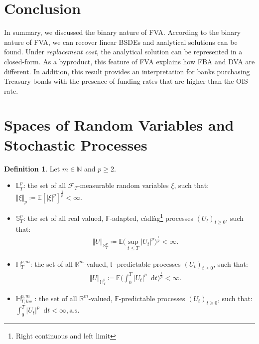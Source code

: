 \documentclass[a4paper, 11pt]{article}              %
\numberwithin{equation}{section}
\theoremstyle{plain}
\newcommand{\1}{\mathds{1}}
\newcommand{\calF}{\mathcal{F}}
\newcommand{\dsE}{\mathbb{E}}
\newcommand{\dsF}{\mathbb{F}}
\newcommand{\dsH}{\mathbb{H}}
\newcommand{\dsL}{\mathbb{L}}
\newcommand{\dsR}{\mathbb{R}}
\newcommand{\dsS}{\mathbb{S}}
\theoremstyle{plain}
\newtheorem{definition}[thm]{Definition}
\theoremstyle{definition}
\newtheorem{definition}{Definition}
\theoremstyle{plain}
\newcommand*\df{\mathop{}\!\mathrm{d}}
\begin{document}
\section{Conclusion}
In summary, we discussed the binary nature of FVA. According to the binary
nature of FVA, we can recover linear BSDEs and analytical solutions can be
found. Under \textit{replacement cost}, the analytical solution can be
represented in a closed-form. As a byproduct, this feature of FVA explains how
FBA and DVA are different.  In addition, this result provides an interpretation
for banks purchasing Treasury bonds with the presence of funding rates that are
higher than the OIS rate.


   
 
\appendix

\section{Spaces of Random Variables and Stochastic Processes}
\label{sec:spaces}       
\begin{definition} Let $m \in \mathbb{N}$ and $p \geq 2$.
\begin{itemize}
\item $\dsL^p_T$: the set of all $\calF_T$-measurable random variables $\xi$, such that:
 $ \Vert\xi \Vert_p\coloneqq \dsE[|\xi|^p]^{\frac{1}{p}}<\infty$. 
\item $\dsS^p_T$: the set of all real valued,
  $\dsF$-adapted, c\`adl\`ag\footnote{Right continuous
    and left limit} processes $(U_t)_{t\geq0}$, such that:
  \begin{align}
    \Vert U \Vert_{\dsS_T^p} \coloneqq \dsE\big(\sup\limits_{t \leq T}\vert
    U_t\vert^p\big)^{\frac{1}{p}}< \infty.  \nonumber
  \end{align}
\item $\dsH^{p, m}_T$: the set of all $\dsR^m$-valued, $\dsF$-predictable
   processes $(U_t)_{t\geq0}$, such that:
  \begin{align}
    \Vert U \Vert_{\dsH^p_T} \coloneqq \dsE\Big(\int_0^T\big\vert U_t \big\vert^p\df
    t\Big)^{\frac{1}{p}} < \infty. \nonumber 
  \end{align}
\item $\dsH^{p, m}_{T, loc}$ : the set of all $\dsR^m$-valued, $\dsF$-predictable
   processes $(U_t)_{t\geq0}$, such that:
 $\int_0^T\big\vert U_t \big\vert^p\df t< \infty, \text{a.s.}$ 
\end{itemize}
\end{definition}
\end{document}
